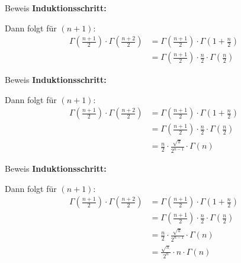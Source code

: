 \documentclass[10pt]{beamer}
\begin{document}
\begin{frame}{Beweis}
    \textbf{Induktionsschritt:}

    Dann folgt für \( \left( n + 1 \right) \):
    \begin{align*}
        \Gamma\left( \frac{n + 1}{2} \right) \cdot \Gamma\left( \frac{n + 2}{2} \right)
        & = \Gamma\left( \frac{n + 1}{2} \right) \cdot \Gamma\left( 1 + \frac{n}{2} \right) \\
        & = \Gamma\left( \frac{n + 1}{2} \right) \cdot \frac{n}{2} \cdot \Gamma\left( \frac{n}{2} \right)
    \end{align*}
\end{frame}



\begin{frame}{Beweis}
    \textbf{Induktionsschritt:}

    Dann folgt für \( \left( n + 1 \right) \):
    \begin{align*}
        \Gamma\left( \frac{n + 1}{2} \right) \cdot \Gamma\left( \frac{n + 2}{2} \right)
        & = \Gamma\left( \frac{n + 1}{2} \right) \cdot \Gamma\left( 1 + \frac{n}{2} \right) \\
        & = \Gamma\left( \frac{n + 1}{2} \right) \cdot \frac{n}{2} \cdot \Gamma\left( \frac{n}{2} \right) \\
        & = \frac{n}{2} \cdot \frac{\sqrt{\pi}}{2^{n - 1}} \cdot \Gamma\left( n \right)
    \end{align*}
\end{frame}



\begin{frame}{Beweis}
    \textbf{Induktionsschritt:}

    Dann folgt für \( \left( n + 1 \right) \):
    \begin{align*}
        \Gamma\left( \frac{n + 1}{2} \right) \cdot \Gamma\left( \frac{n + 2}{2} \right)
        & = \Gamma\left( \frac{n + 1}{2} \right) \cdot \Gamma\left( 1 + \frac{n}{2} \right) \\
        & = \Gamma\left( \frac{n + 1}{2} \right) \cdot \frac{n}{2} \cdot \Gamma\left( \frac{n}{2} \right) \\
        & = \frac{n}{2} \cdot \frac{\sqrt{\pi}}{2^{n - 1}} \cdot \Gamma\left( n \right) \\
        & = \frac{\sqrt{\pi}}{2^{n}} \cdot n \cdot \Gamma\left( n \right)
    \end{align*}
\end{frame}
\end{document}
